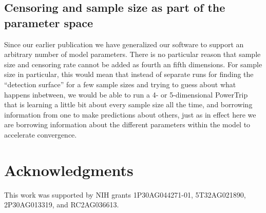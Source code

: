 \documentclass[review, authoryear]{elsarticle}
\begin{document}
\subsection{Censoring and sample size as part of the parameter
space}\label{censoring-and-sample-size-as-part-of-the-parameter-space}

Since our earlier publication \citep{bokov2017riskmodels} we have
generalized our software to support an arbitrary number of model
parameters. There is no particular reason that sample size and censoring
rate cannot be added as fourth an fifth dimensions. For sample size in
particular, this would mean that instead of separate runs for finding
the ``detection surface'' for a few sample sizes and trying to guess
about what happens inbetween, we would be able to run a 4- or
5-dimensional PowerTrip that is learning a little bit about every sample
size all the time, and borrowing information from one to make
predictions about others, just as in effect here we are borrowing
information about the different parameters within the model to
accelerate convergence.

\section*{Acknowledgments}\label{acknowledgments}

This work was supported by NIH grants 1P30AG044271-01, 5T32AG021890,
2P30AG013319, and RC2AG036613.

{}

\end{document}

